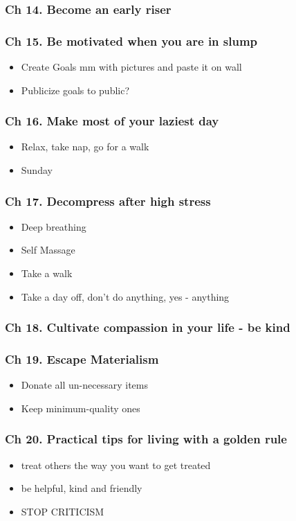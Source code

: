 \begin{frame}[fragile]
\frametitle{Ch 14. Become an early riser}
\end{frame}

\begin{frame}[fragile]
\frametitle{Ch 15. Be motivated when you are in slump}
\begin{itemize}[noitemsep,nolistsep]
\item Create Goals mm with pictures and paste it on wall
\item Publicize goals to public?
\end{itemize}
\end{frame}

\begin{frame}[fragile]
\frametitle{Ch 16. Make most of your laziest day}
\begin{itemize}[noitemsep,nolistsep]
\item Relax, take nap, go for a walk
\item Sunday
\end{itemize}
\end{frame}

\begin{frame}[fragile]
\frametitle{Ch 17. Decompress after high stress}
\begin{itemize}[noitemsep,nolistsep]
\item Deep breathing
\item Self Massage
\item Take a walk
\item Take a day off, don't do anything, yes - anything
\end{itemize}
\end{frame}

\begin{frame}[fragile]
\frametitle{Ch 18. Cultivate compassion in your life - be kind}
\end{frame}

\begin{frame}[fragile]
\frametitle{Ch 19. Escape Materialism}
\begin{itemize}[noitemsep,nolistsep]
\item Donate all un-necessary items
\item Keep minimum-quality ones
\end{itemize}
\end{frame}

\begin{frame}[fragile]
\frametitle{Ch 20. Practical tips for living with a golden rule}
\begin{itemize}[noitemsep,nolistsep]
\item treat others the way you want to get treated
\item be helpful, kind and friendly
\item STOP CRITICISM
\end{itemize}
\end{frame}

